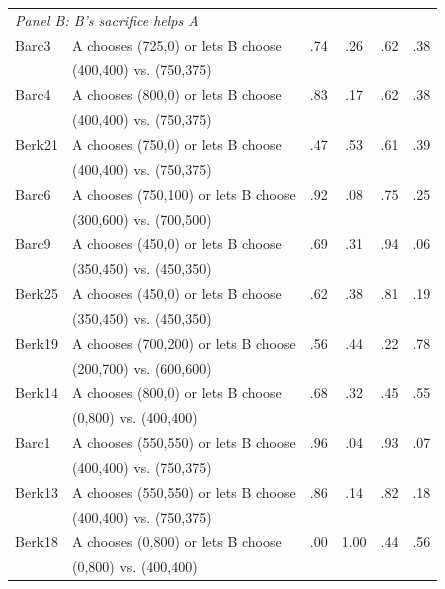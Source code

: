 \begin{table}[h!]
\begin{center}
\begin{tabular}{llcccc}
\multicolumn{6}{l}{\textit{Panel B: B's sacrifice helps A}} \\[0.5ex]
Barc3 & A chooses (725,0) or lets B choose & .74 & .26 & .62 & .38 \\
& (400,400) vs. (750,375) & & & & \\
Barc4 & A chooses (800,0) or lets B choose & .83 & .17 & .62 & .38 \\
& (400,400) vs. (750,375) & & & & \\
Berk21 & A chooses (750,0) or lets B choose & .47 & .53 & .61 & .39 \\
& (400,400) vs. (750,375) & & & & \\
Barc6 & A chooses (750,100) or lets B choose & .92 & .08 & .75 & .25 \\
& (300,600) vs. (700,500) & & & & \\
Barc9 & A chooses (450,0) or lets B choose & .69 & .31 & .94 & .06 \\
& (350,450) vs. (450,350) & & & & \\
Berk25 & A chooses (450,0) or lets B choose & .62 & .38 & .81 & .19 \\
& (350,450) vs. (450,350) & & & & \\
Berk19 & A chooses (700,200) or lets B choose & .56 & .44 & .22 & .78 \\
& (200,700) vs. (600,600) & & & & \\
Berk14 & A chooses (800,0) or lets B choose & .68 & .32 & .45 & .55 \\
& (0,800) vs. (400,400) & & & & \\
Barc1 & A chooses (550,550) or lets B choose & .96 & .04 & .93 & .07 \\
& (400,400) vs. (750,375) & & & & \\
Berk13 & A chooses (550,550) or lets B choose & .86 & .14 & .82 & .18 \\
& (400,400) vs. (750,375) & & & & \\
Berk18 & A chooses (0,800) or lets B choose & .00 & 1.00 & .44 & .56 \\
& (0,800) vs. (400,400) & & & & \\[1ex]


\end{tabular}
\end{center}
\end{table}
